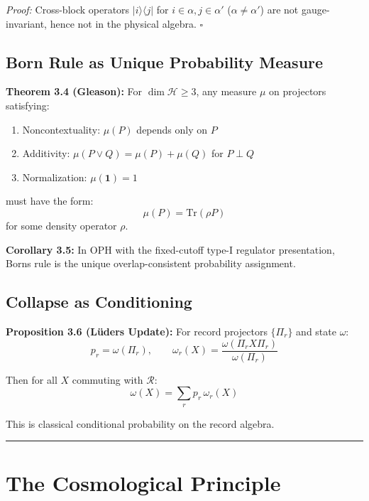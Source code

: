 \emph{Proof:} Cross-block operators \(|i\rangle\langle j|\) for \(i \in \alpha, j \in \alpha'\) (\(\alpha \neq \alpha'\)) are not gauge-invariant, hence not in the physical algebra. \(\square\)

\subsection{Born Rule as Unique Probability Measure}\label{35-born-rule-as-unique-probability-measure}

\textbf{Theorem 3.4 (Gleason):} For \(\dim \mathcal{H} \geq 3\), any measure \(\mu\) on projectors satisfying:

\begin{enumerate}
\def\labelenumi{\arabic{enumi}.}
\tightlist
\item
 Noncontextuality: \(\mu(P)\) depends only on \(P\)
\item
 Additivity: \(\mu(P \vee Q) = \mu(P) + \mu(Q)\) for \(P \perp Q\)
\item
 Normalization: \(\mu(\mathbf{1}) = 1\)
\end{enumerate}

must have the form: \[\mu(P) = \text{Tr}(\rho P)\] for some density operator \(\rho\).

\textbf{Corollary 3.5:} In OPH with the fixed-cutoff type-I regulator presentation, Born\textquotesingle s rule is the unique overlap-consistent probability assignment.

\subsection{Collapse as Conditioning}\label{36-collapse-as-conditioning}

\textbf{Proposition 3.6 (L\"{u}ders Update):} For record projectors \(\{\Pi_r\}\) and state \(\omega\): \[p_r = \omega(\Pi_r), \qquad \omega_r(X) = \frac{\omega(\Pi_r X \Pi_r)}{\omega(\Pi_r)}\]

Then for all \(X\) commuting with \(\mathcal{R}\): \[\omega(X) = \sum_r p_r \, \omega_r(X)\]

This is classical conditional probability on the record algebra.

\begin{center}\rule{0.5\linewidth}{0.5pt}\end{center}

\section{The Cosmological Principle}\label{4-the-cosmological-principle}

